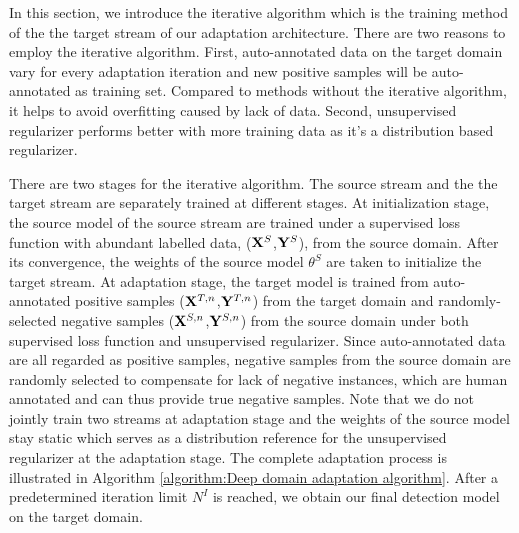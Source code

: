 \documentclass[runningheads]{llncs}
\begin{document}
In this section, we introduce the iterative algorithm which is the training method of the the target stream of our adaptation architecture. There are two reasons to employ the iterative algorithm. First, auto-annotated data on the target domain vary for every adaptation iteration and new positive samples will be auto-annotated as training set. Compared to methods without the iterative algorithm, it helps to avoid overfitting caused by lack of data. Second, unsupervised regularizer performs better with more training data as it's a distribution based regularizer.

There are two stages for the iterative algorithm. The source stream and the the target stream are separately trained at different stages. At initialization stage, the source model of the source stream are trained under a supervised loss function with abundant labelled data, (${\bf X}^{S}$,${\bf Y}^{S}$), from the source domain. After its convergence, the weights of the source model $\theta^{S}$ are taken to initialize the target stream. At adaptation stage, the target model is trained from auto-annotated positive samples (${\bf X}^{T,n}$,${\bf Y}^{T,n}$) from the target domain and randomly-selected negative samples (${\bf X}^{S,n}$,${\bf Y}^{S,n}$) from the source domain under both supervised loss function and unsupervised regularizer. Since auto-annotated data are all regarded as positive samples, negative samples from the source domain are randomly selected to compensate for lack of negative instances, which are human annotated and can thus provide true negative samples. Note that we do not jointly train two streams at adaptation stage and the weights of the source model stay static which serves as a distribution reference for the unsupervised regularizer at the adaptation stage. The complete adaptation process is illustrated in Algorithm \ref{algorithm:Deep domain adaptation algorithm}. After a predetermined iteration limit $N^{I}$ is reached, we obtain our final detection model on the target domain.
\end{document}
